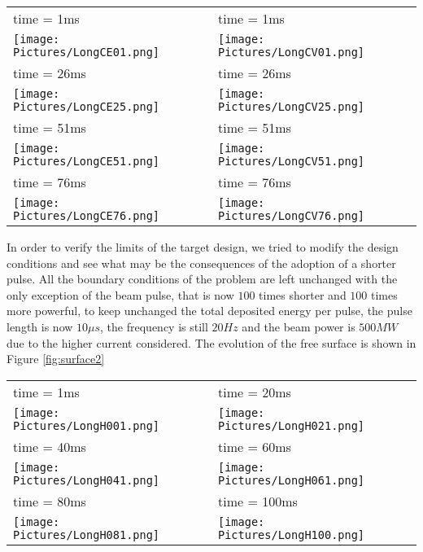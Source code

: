 \documentclass[a4paper, 11pt, twocolumn]{article}
\begin{document}
\begin{figure*}
\centering
\begin{tabular}{|l|l|}
\hline
\small time = 1ms & \small time = 1ms \\
\texttt{[image: Pictures/LongCE01.png]} &
\texttt{[image: Pictures/LongCV01.png]} \\
\hline
\small time = 26ms & \small time = 26ms \\
\texttt{[image: Pictures/LongCE25.png]} &
\texttt{[image: Pictures/LongCV25.png]} \\
\hline
\small time = 51ms & \small time = 51ms \\
\texttt{[image: Pictures/LongCE51.png]} &
\texttt{[image: Pictures/LongCV51.png]} \\
\hline
\small time = 76ms & \small time = 76ms \\
\texttt{[image: Pictures/LongCE76.png]} &
\texttt{[image: Pictures/LongCV76.png]} \\
\hline
\end{tabular}
\caption{Transient response to the pulsed heating. The energy density is in $[J/kg]$ and the vertical velocity in $[m/s]$.}
\label{fig:surface1}
\end{figure*}

In order to verify the limits of the target design, we tried to modify the design conditions and see what may be the consequences of the adoption of a shorter pulse. All the boundary conditions of the problem are left unchanged with the only exception of the beam pulse, that is now $100$ times shorter and $100$ times more powerful, to keep unchanged the total deposited energy per pulse, the pulse length is now $10 \mu s$, the frequency is still $20 Hz$ and the beam power is $500MW$ due to the higher current considered. The evolution of the free surface is shown in Figure \ref{fig:surface2}

\begin{figure*}
\centering
\begin{tabular}{|l|l|}
\hline
\small time = 1ms & time = 20ms \\
\texttt{[image: Pictures/LongH001.png]} &
\texttt{[image: Pictures/LongH021.png]} \\
\hline
\small time = 40ms & time = 60ms \\
\texttt{[image: Pictures/LongH041.png]} &
\texttt{[image: Pictures/LongH061.png]} \\
\hline
\small time = 80ms & time = 100ms \\
\texttt{[image: Pictures/LongH081.png]} &
\texttt{[image: Pictures/LongH100.png]} \\
\hline
\end{tabular}
\caption{Transient response to the pulsed heating for a pulse length of $10 \mu s$. The energy density is in $[J/kg]$.}
\label{fig:surface2}
\end{figure*}
\end{document}
